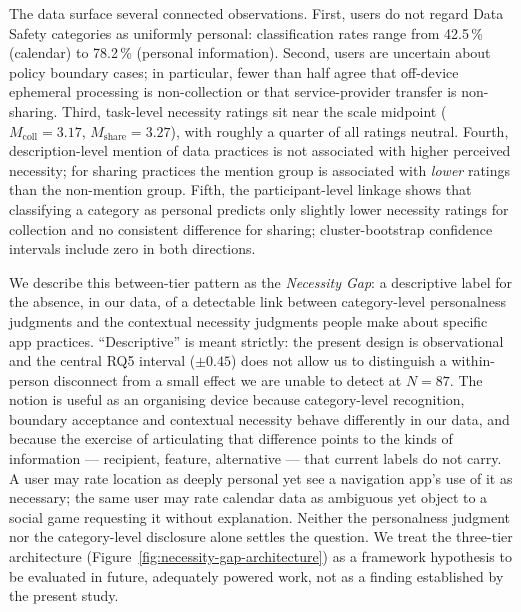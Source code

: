 \documentclass[11pt,a4paper]{article}
\begin{document}
The data surface several connected observations. First, users do not regard Data Safety
categories as uniformly personal: classification rates range from 42.5\,\%
(calendar) to 78.2\,\% (personal information). Second, users are uncertain
about policy boundary cases; in particular, fewer than half agree that
off-device ephemeral processing is non-collection or that
service-provider transfer is non-sharing. Third, task-level necessity
ratings sit near the scale midpoint
($M_{\text{coll}}=3.17$, $M_{\text{share}}=3.27$), with roughly a quarter
of all ratings neutral. Fourth, description-level mention of data
practices is not associated with higher perceived necessity; for sharing
practices the mention group is associated with \emph{lower} ratings than
the non-mention group. Fifth, the participant-level linkage shows that
classifying a category as personal predicts only slightly lower necessity
ratings for collection and no consistent difference for sharing;
cluster-bootstrap confidence intervals include zero in both directions.

We describe this between-tier pattern as the \emph{Necessity Gap}: a
descriptive label for the absence, in our data, of a detectable link
between category-level personalness judgments and the contextual
necessity judgments people make about specific app practices.
``Descriptive'' is meant strictly: the present design is observational
and the central RQ5 interval ($\pm 0.45$) does not allow us to
distinguish a within-person disconnect from a small effect we are
unable to detect at $N=87$. The notion is useful as an organising
device because category-level recognition, boundary acceptance and
contextual necessity behave differently in our data, and because the
exercise of articulating that difference points to the kinds of
information --- recipient, feature, alternative --- that current
labels do not carry. A user may rate location as deeply personal yet
see a navigation app's use of it as necessary; the same user may rate
calendar data as ambiguous yet object to a social game requesting it
without explanation. Neither the personalness judgment nor the
category-level disclosure alone settles the question. We treat the
three-tier architecture (Figure~\ref{fig:necessity-gap-architecture})
as a framework hypothesis to be evaluated in future, adequately
powered work, not as a finding established by the present study.


\end{document}
